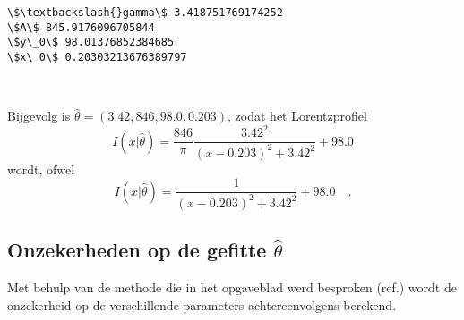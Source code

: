 \documentclass[11pt]{article}
\begin{document}
    \begin{Verbatim}[commandchars=\\\{\}]
\$\textbackslash{}gamma\$ 3.418751769174252
\$A\$ 845.9176096705844
\$y\_0\$ 98.01376852384685
\$x\_0\$ 0.20303213676389797
    \end{Verbatim}

    \begin{center}
    \end{center}
    { \hspace*{\fill} \\}
    
    Bijgevolg is \(\hat{ \theta}=(3.42,846,98.0,0.203)\), zodat het
Lorentzprofiel
\[I(x \vert \hat{ \theta})= \frac{846}{ \pi} \frac{3.42^2}{(x-0.203)^2+3.42^2}+98.0\]
wordt, ofwel
\[I(x \vert \hat{ \theta})= \frac{1}{(x-0.203)^2+3.42^2}+98.0 \quad.\]

    \hypertarget{onzekerheden-op-de-gefitte-hattheta}{%
\subsection{\texorpdfstring{Onzekerheden op de gefitte
\(\hat{\theta}\)}{Onzekerheden op de gefitte \textbackslash hat\{\textbackslash theta\}}}\label{onzekerheden-op-de-gefitte-hattheta}}

    Met behulp van de methode die in het opgaveblad werd besproken (ref.)
wordt de onzekerheid op de verschillende parameters achtereenvolgens
berekend.
\end{document}
